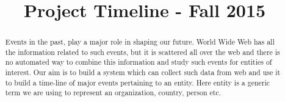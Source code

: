 \documentclass[10pt,conference]{IEEEtran}
\begin{document}
\title{Project Timeline - Fall 2015}
\author{
\and
{}
\and
{}
}

\maketitle
\begin{abstract}
\textnormal{
Events in the past, play a major role in shaping our future. World Wide Web has all the information related to such events, but it is scattered all over the web and there is no automated way to combine this information and study such events for entities of interest. Our aim is to build a system which can collect such data from web and use it to build a time-line of major events pertaining to an entity. Here entity is a generic term we are using to represent an organization, country, person etc.
}
\end{abstract}

\IEEEpeerreviewmaketitle
\end{document}
